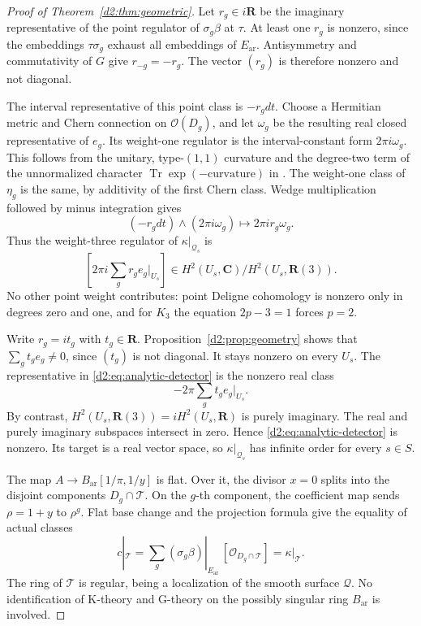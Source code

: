 \documentclass[11pt,a4paper]{amsart}
\numberwithin{equation}{section}
\theoremstyle{definition}
\theoremstyle{remark}
\newcommand{\DtwoRR}{\mathbf{R}}
\newcommand{\DtwoCC}{\mathbf{C}}
\newcommand{\DtwocO}{\mathcal O}
\newcommand{\DtwocQ}{\mathcal Q}
\newcommand{\DtwocT}{\mathcal T}
\newcommand{\Dtwoar}{\mathrm{ar}}
\DeclareMathOperator{\DtwoTr}{Tr}
\begin{document}
\begin{proof}[Proof of Theorem~\ref{d2:thm:geometric}]
Let \(r_g\in i\DtwoRR\) be the imaginary representative of the point
regulator of \(\sigma_g\beta\) at \(\tau\).
At least one \(r_g\) is nonzero, since the embeddings
\(\tau\sigma_g\) exhaust all embeddings of \(E_{\Dtwoar}\).
Antisymmetry and commutativity of \(G\) give \(r_{-g}=-r_g\).
The vector \((r_g)\) is therefore nonzero and not diagonal.

The interval representative of this point class is \(-r_gdt\).
Choose a Hermitian metric and Chern connection on \(\DtwocO(D_g)\),
and let \(\omega_g\) be the resulting real closed representative of
\(e_g\). Its weight-one regulator is the interval-constant form
\(2\pi i\omega_g\).
This follows from the unitary, type-\((1,1)\) curvature and the
degree-two term of the unnormalized character
\(\DtwoTr\exp(-\mathrm{curvature})\) in
\cite[Definitions~2.16--2.20]{BunkeTamme}.
The weight-one class of \(\eta_g\) is the same, by additivity of
the first Chern class.
Wedge multiplication followed by minus integration gives
\[
 (-r_gdt)\wedge(2\pi i\omega_g)
 \longmapsto 2\pi i r_g\omega_g.
\]
Thus the weight-three regulator of \(\kappa|_{\DtwocQ_s}\) is
\begin{equation}\label{d2:eq:analytic-detector}
 \left[2\pi i\sum_g r_g e_g|_{U_s}\right]
 \in H^2(U_s,\DtwoCC)/H^2(U_s,\DtwoRR(3)).
\end{equation}
No other point weight contributes: point Deligne cohomology is
nonzero only in degrees zero and one, and for \(K_3\) the equation
\(2p-3=1\) forces \(p=2\).

Write \(r_g=it_g\) with \(t_g\in\DtwoRR\).
Proposition~\ref{d2:prop:geometry} shows that
\(\sum_g t_ge_g\ne0\), since \((t_g)\) is not diagonal.
It stays nonzero on every \(U_s\).
The representative in \eqref{d2:eq:analytic-detector} is the nonzero
real class
\[
 -2\pi\sum_g t_ge_g|_{U_s}.
\]
By contrast, \(H^2(U_s,\DtwoRR(3))=iH^2(U_s,\DtwoRR)\) is purely imaginary.
The real and purely imaginary subspaces intersect in zero.
Hence \eqref{d2:eq:analytic-detector} is nonzero.
Its target is a real vector space, so
\(\kappa|_{\DtwocQ_s}\) has infinite order for every \(s\in S\).

The map \(A\to B_{\Dtwoar}[1/\pi,1/y]\) is flat.
Over it, the divisor \(x=0\) splits into the disjoint components
\(D_g\cap\DtwocT\).
On the \(g\)-th component, the coefficient map sends
\(\rho=1+y\) to \(\rho^g\).
Flat base change and the projection formula give the equality of
actual classes
\begin{equation}\label{d2:eq:analytic-splitting}
 c|_{\DtwocT}
 =\sum_g(\sigma_g\beta)|_{E_{\Dtwoar}}\,[\DtwocO_{D_g\cap\DtwocT}]
 =\kappa|_{\DtwocT}.
\end{equation}
The ring of \(\DtwocT\) is regular, being a localization of the smooth
surface \(\DtwocQ\). No identification of K-theory and G-theory on the
possibly singular ring \(B_{\Dtwoar}\) is involved.


\end{proof}
\end{document}
